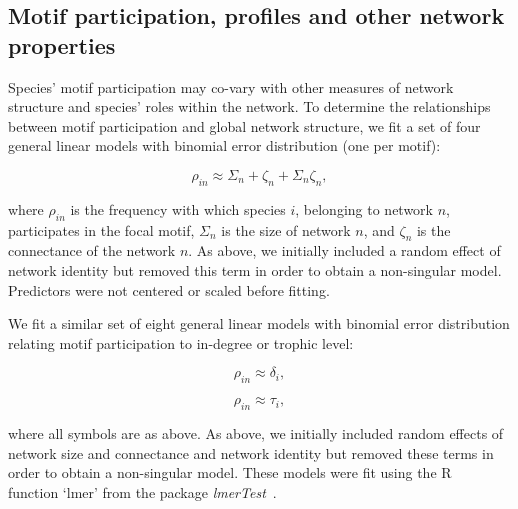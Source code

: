 \documentclass[12pt]{article}
\begin{document}
\begin{spacing}{2.0}
    \subsection{Motif participation, profiles and other network properties}

        Species' motif participation may co-vary with other measures of network structure and species' roles within the network.
        To determine the relationships between motif participation and global network structure, we fit a set of four general linear models with binomial error distribution (one per motif):

        \begin{spacing}{1.0}
        \begin{equation}
            \rho_{in} \approx \Sigma_{n} + \zeta_{n} + \Sigma_{n}\zeta_{n},
            \label{partic_SC}
        \end{equation}
        \end{spacing}
        
        \noindent where $\rho_{in}$ is the frequency with which species $i$, belonging to network $n$, participates in the focal motif, $\Sigma_{n}$ is the size of network $n$, and $\zeta_{n}$ is the connectance of the network $n$.
        As above, we initially included a random effect of network identity but removed this term in order to obtain a non-singular model.
        Predictors were not centered or scaled before fitting.

       
        We fit a similar set of eight general linear models with binomial error distribution relating motif participation to in-degree or trophic level:

        \begin{spacing}{1.0}
        \begin{multicols}{2}
        \begin{equation}
            \rho_{in} \approx \delta_{i},
            \label{partic_deg}
        \end{equation}

        \begin{equation}
            \rho_{in} \approx \tau_{i},
            \label{partic_tl}
        \end{equation}
        \end{multicols}
        \end{spacing}
        
        \noindent where all symbols are as above. 
        As above, we initially included random effects of network size and connectance and network identity but removed these terms in order to obtain a non-singular model.
        These models were fit using the R~\citep{R} function `lmer' from the package \emph{lmerTest}~\citep{lmerTest}.


\end{spacing}
\end{document}
